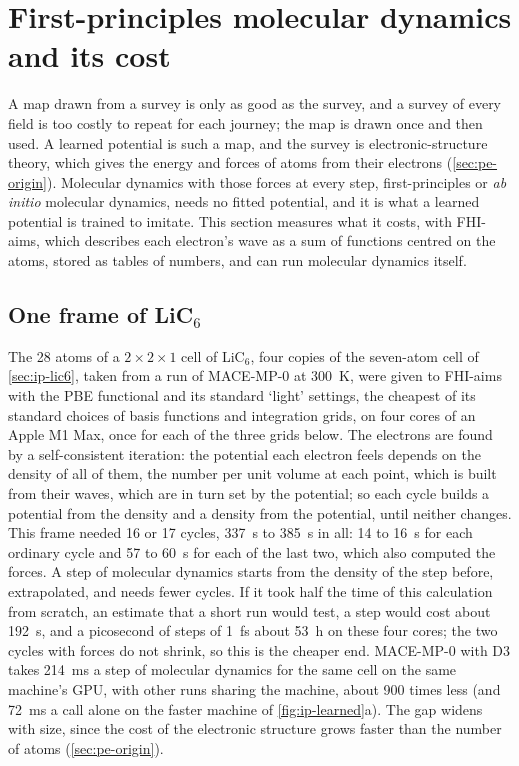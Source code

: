 \section{First-principles molecular dynamics and its cost}
\label{sec:ip-aimd}

A map drawn from a survey is only as good as the survey, and a survey of
every field is too costly to repeat for each journey; the map is drawn
once and then used. A learned potential is such a map, and the survey is
electronic-structure theory, which gives the energy and forces of atoms
from their electrons (\cref{sec:pe-origin}). Molecular dynamics with
those forces at every step, first-principles or \emph{ab initio}
molecular dynamics, needs no fitted potential, and it is what a learned
potential is trained to imitate. This section measures what it costs,
with FHI-aims\cite{Blum2009}, which describes each electron's wave as a
sum of functions centred on the atoms, stored as tables of numbers, and
can run molecular dynamics itself.

\subsection*{One frame of LiC$_6$}

The 28 atoms of a $2\times2\times1$ cell of LiC$_6$, four copies of the
seven-atom cell of \cref{sec:ip-lic6}, taken from a run of MACE-MP-0 at
\SI{300}{\kelvin}, were given to FHI-aims with the PBE functional and its
standard `light' settings, the cheapest of its standard choices of basis
functions and integration grids, on four cores of an Apple M1 Max, once
for each of the three grids below. The electrons are found by a
self-consistent iteration: the potential each electron feels depends on
the density of all of them, the number per unit volume at each point,
which is built from their waves, which are in turn set by the potential;
so each cycle builds a potential from the density and a density from the
potential, until neither changes. This frame needed 16 or 17 cycles,
\SI{337}{\second} to \SI{385}{\second} in all: 14 to \SI{16}{\second} for
each ordinary cycle and 57 to \SI{60}{\second} for each of the last two,
which also computed the forces. A step of molecular dynamics starts from
the density of the step before, extrapolated, and needs fewer cycles. If
it took half the time of this calculation from scratch, an estimate that
a short run would test, a step would cost about \SI{192}{\second}, and a
picosecond of steps of \SI{1}{\femto\second} about \SI{53}{\hour} on these
four cores; the two cycles with forces do not shrink, so this is the
cheaper end. MACE-MP-0 with D3 takes \SI{214}{\milli\second} a step of
molecular dynamics for the same cell on the same machine's GPU, with other
runs sharing the machine, about 900 times less (and
\SI{72}{\milli\second} a call alone on the faster machine of
\cref{fig:ip-learned}a). The gap widens with size, since the cost of the
electronic structure grows faster than the number of atoms
(\cref{sec:pe-origin}).

